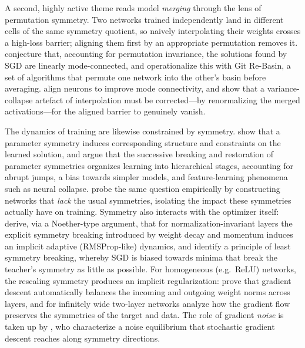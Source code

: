 \documentclass[mathematics,review,submit,moreauthors]{Definitions/mdpi}
\begin{document}
A second, highly active theme reads model \emph{merging} through the lens of permutation symmetry.
Two networks trained independently land in different cells of the same symmetry quotient, so naively interpolating their weights crosses a high-loss barrier; aligning them first by an appropriate permutation removes it.
\citet{entezari2022} conjecture that, accounting for permutation invariance, the solutions found by SGD are linearly mode-connected, and \citet{ainsworth2023} operationalize this with Git Re-Basin, a set of algorithms that permute one network into the other's basin before averaging.
\citet{tatro2020} align neurons to improve mode connectivity, and \citet{jordan2023} show that a variance-collapse artefact of interpolation must be corrected---by renormalizing the merged activations---for the aligned barrier to genuinely vanish.

The dynamics of training are likewise constrained by symmetry.
\citet{ziyin2024} show that a parameter symmetry induces corresponding structure and constraints on the learned solution, and \citet{ziyin2025} argue that the successive breaking and restoration of parameter symmetries organizes learning into hierarchical stages, accounting for abrupt jumps, a bias towards simpler models, and feature-learning phenomena such as neural collapse.
\citet{lim2024} probe the same question empirically by constructing networks that \emph{lack} the usual symmetries, isolating the impact these symmetries actually have on training.
Symmetry also interacts with the optimizer itself: \citet{tanaka2021} derive, via a Noether-type argument, that for normalization-invariant layers the explicit symmetry breaking introduced by weight decay and momentum induces an implicit adaptive (RMSProp-like) dynamics, and \citet{arjevani2023} identify a principle of least symmetry breaking, whereby SGD is biased towards minima that break the teacher's symmetry as little as possible.
For homogeneous (e.g.\ ReLU) networks, the rescaling symmetry produces an implicit regularization: \citet{du2018anips} prove that gradient descent automatically balances the incoming and outgoing weight norms across layers, and for infinitely wide two-layer networks \citet{hajjar2023} analyze how the gradient flow preserves the symmetries of the target and data.
The role of gradient \emph{noise} is taken up by \citet{ziyin2024a}, who characterize a noise equilibrium that stochastic gradient descent reaches along symmetry directions.
\end{document}
